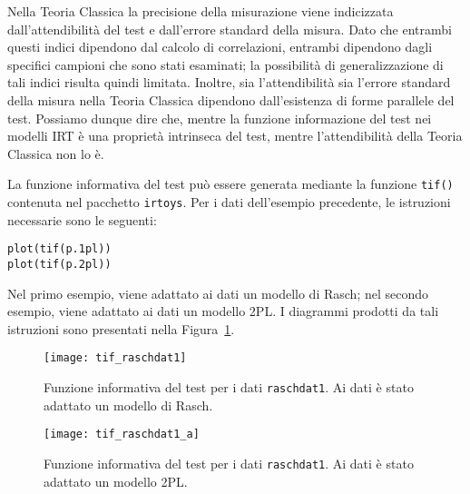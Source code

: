 Nella Teoria Classica la precisione della misurazione viene indicizzata  dall'attendibilità del test e dall'errore standard della misura. Dato che entrambi questi indici dipendono dal calcolo di correlazioni, entrambi dipendono dagli specifici campioni che sono stati esaminati; la possibilità di generalizzazione di tali indici risulta quindi limitata. Inoltre, sia l'attendibilità sia l'errore standard della misura nella Teoria Classica dipendono dall'esistenza di forme parallele del test. Possiamo dunque dire che, mentre la funzione informazione del test nei modelli IRT è una proprietà intrinseca del test, mentre l'attendibilità della Teoria Classica non lo è.



\begin{exmp}
La funzione informativa del test può essere generata mediante la funzione {\tt tif()} contenuta nel pacchetto {\tt irtoys}. Per i dati dell'esempio precedente, le istruzioni necessarie sono le seguenti: 
\begin{lstlisting}
plot(tif(p.1pl))
plot(tif(p.2pl))
\end{lstlisting}
Nel primo esempio, viene adattato ai dati un modello di Rasch; nel secondo esempio, viene adattato ai dati un modello 2PL. I diagrammi prodotti da tali istruzioni sono presentati nella Figura~\ref{fig:tif_raschdat1}. 
\end{exmp}

\begin{figure}[h!]
   \centering
     \texttt{[image: tif\_raschdat1]}
     \caption{Funzione informativa del test per i dati {\tt raschdat1}. Ai dati è stato adattato un modello di Rasch.}
     \label{fig:tif_raschdat1}
 \end{figure}


 \begin{figure}[h!]
   \centering
     \texttt{[image: tif\_raschdat1\_a]}
     \caption{Funzione informativa del test per i dati {\tt raschdat1}. Ai dati è stato adattato un modello 2PL.}
     \label{fig:tif_raschdat1_a}
 \end{figure}


